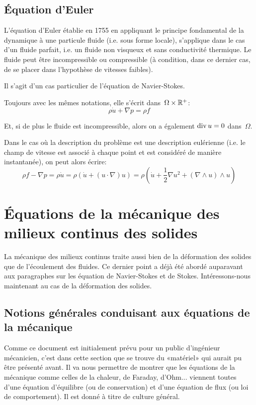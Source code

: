\medskip
\subsection{Équation d'Euler}


L'équation d'Euler établie en 1755 en appliquant le principe fondamental de la dynamique
à une particule fluide (i.e. sous forme locale), s'applique dans le cas d'un fluide parfait, i.e. 
un fluide non visqueux et sans conductivité thermique. 
Le fluide peut être incompressible ou compressible (à condition, dans ce dernier cas, de 
se placer dans l'hypothèse de vitesses faibles). 

Il s'agit d'un cas particulier de l'équation de Navier-Stokes.

\medskip
Toujours avec les mêmes notations, elle s'écrit dans~$\Omega\times\mathbb R^+$:
\begin{equation}
\rho \dot{u} + \nabla p = \rho f
\end{equation}

Et, si de plus le fluide est incompressible, alors on a également 
$\operatorname{div} u = 0$ dans~$\Omega$.

\medskip{}
Dans le cas où la description du problème est une description eulérienne (i.e. le champ de
vitesse est associé à chaque point et est considéré de manière instantanée), on peut alors écrire:
\begin{equation}
  \rho f - \nabla p = \rho \dot{u} =
	\rho \left(\dot{u} + (u\cdot\nabla)u \right)=
	\rho \left( \dot{u} + \frac12 \nabla u^2 + (\nabla\wedge u)\wedge u \right)
\end{equation}

\medskip
{}

\medskip
\section{Équations de la mécanique des milieux continus des solides}
La mécanique des milieux continus traite aussi bien de la déformation des solides que de l'écoulement des fluides.
Ce dernier point a déjà été abordé auparavant aux paragraphes sur les équation de Navier-Stokes et de Stokes.
Intéressons-nous maintenant au cas de la déformation des solides.

\medskip{}
\subsection{Notions générales conduisant aux équations de la mécanique}
Comme ce document est initialement prévu pour un public d'ingénieur mécanicien,
c'est dans cette section que se trouve du «matériel» qui aurait pu être présenté avant. Il va nous permettre de montrer que les équations de la mécanique comme celles de la chaleur, de Faraday, d'Ohm... viennent toutes d'une équation d'équilibre (ou de conservation) et d'une équation de flux (ou loi de comportement). Il est donné à titre de culture général.

